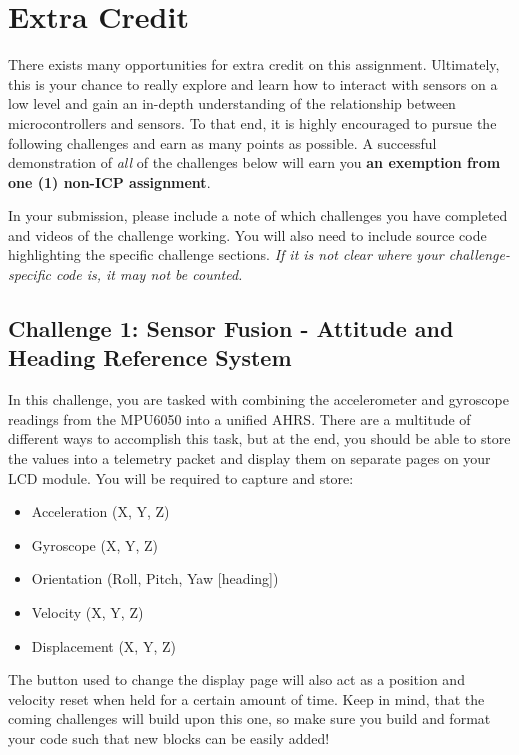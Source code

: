 \section*{Extra Credit} 
There exists many opportunities for extra credit on this assignment. 
Ultimately, this is your chance to really explore and learn how to interact with sensors on a low level and gain an in-depth understanding of the relationship between microcontrollers and sensors.
To that end, it is highly encouraged to pursue the following challenges and earn as many points as possible.
A successful demonstration of \emph{all} of the challenges below will earn you \textbf{an exemption from one (1) non-ICP assignment}.

In your submission, please include a note of which challenges you have completed and videos of the challenge working. 
You will also need to include source code highlighting the specific challenge sections.
\emph{If it is not clear where your challenge-specific code is, it may not be counted.}

    \subsection*{Challenge 1: Sensor Fusion - Attitude and Heading Reference System}
    In this challenge, you are tasked with combining the accelerometer and gyroscope readings from the MPU6050 into a unified AHRS.
    There are a multitude of different ways to accomplish this task, but at the end, you should be able to store the values into a telemetry packet and display them on separate pages on your LCD module.
    You will be required to capture and store:

    \begin{itemize}
        \item Acceleration (X, Y, Z)
        \item Gyroscope (X, Y, Z)
        \item Orientation (Roll, Pitch, Yaw [heading])
        \item Velocity (X, Y, Z)
        \item Displacement (X, Y, Z)
    \end{itemize}

    The button used to change the display page will also act as a position and velocity reset when held for a certain amount of time.
    Keep in mind, that the coming challenges will build upon this one, so make sure you build and format your code such that new blocks can be easily added!


